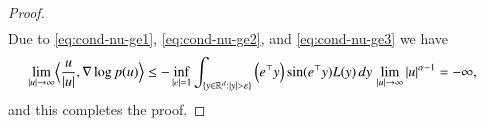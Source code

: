\documentclass[preprint, 3p, authoryear]{elsarticle}
\providecommand{\eps}{\varepsilon}
\newcommand{\R}{\mathbb R}
\theoremstyle{definition}
\begin{document}
\begin{proof}
\begin{align*}
\end{align*} 
Due to \eqref{eq:cond-nu-ge1}, \eqref{eq:cond-nu-ge2}, and \eqref{eq:cond-nu-ge3} we have
\begin{align*}
	\lim_{|u|\to \infty}\Bigl\langle \frac{u}{|u|} , \nabla\log p(u) \Bigr\rangle& 
	 \leq - \inf_{|e|=1} \int_{\{y\in\R^d: |y|>\eps\}}\left(e^{\top}y\right)\sin(e^{\top}y)L(y)\,dy \, \lim_{|u|\to \infty}|u|^{\alpha-1} 
	 = -\infty,
\end{align*} 
and this completes the proof.
\end{proof}
\end{document}
